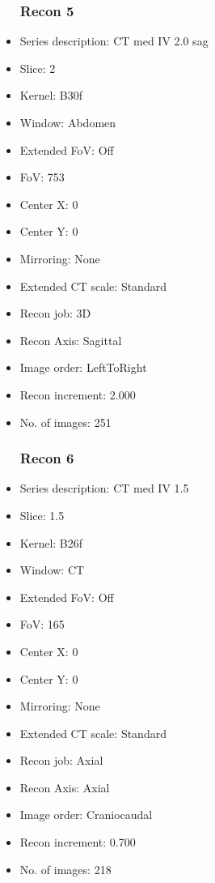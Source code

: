 \documentclass[12pt]{article}
\begin{document}
\begin{itemize}
\subsubsection{Recon 5}
\item Series description: CT med IV  2.0 sag
\item Slice: 2
\item Kernel: B30f
\item Window: Abdomen
\item Extended FoV: Off
\item FoV: 753
\item Center X: 0
\item Center Y: 0
\item Mirroring: None
\item Extended CT scale: Standard
\item Recon job: 3D
\item Recon Axis: Sagittal
\item Image order: LeftToRight
\item Recon increment: 2.000
\item No. of images: 251
\subsubsection{Recon 6}
\item Series description: CT med IV  1.5
\item Slice: 1.5
\item Kernel: B26f
\item Window: CT
\item Extended FoV: Off
\item FoV: 165
\item Center X: 0
\item Center Y: 0
\item Mirroring: None
\item Extended CT scale: Standard
\item Recon job: Axial
\item Recon Axis: Axial
\item Image order: Craniocaudal
\item Recon increment: 0.700
\item No. of images: 218
\end{itemize}
\end{document}

